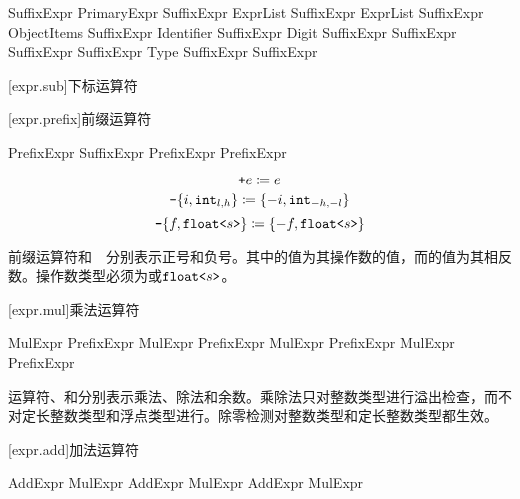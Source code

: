 \begin{bnf}{SuffixExpr}
    PrimaryExpr \br
    SuffixExpr \terminal{[} ExprList\bnfq \terminal{]} \br
    SuffixExpr \terminal{(} ExprList\bnfq \terminal{)} \br
    SuffixExpr \terminal{\{} ObjectItems\bnfq \terminal{\}} \br
    SuffixExpr  Identifier \br
    SuffixExpr  Digit\bnfp \br
    SuffixExpr   \br
    SuffixExpr   \br
    SuffixExpr   \br
    SuffixExpr  Type \br
    SuffixExpr  \br
    SuffixExpr 
\end{bnf}

[expr.sub]{下标运算符}

\pnum


[expr.prefix]{前缀运算符}

\begin{bnf}{PrefixExpr}
    SuffixExpr \br
    \terminal{+} PrefixExpr \br
    \terminal{-} PrefixExpr
\end{bnf}

$$ \texttt{+} e \coloneqq e $$
$$ \texttt{-} \lbrace i, \texttt{int}_{l,h} \rbrace \coloneqq \lbrace -i, \texttt{int}_{-h,-l} \rbrace $$
$$ \texttt{-} \lbrace f, \texttt{float<}s\texttt{>} \rbrace \coloneqq \lbrace -f, \texttt{float<}s\texttt{>}\rbrace $$

\pnum
前缀运算符\tcode{+}和\ \tcode{-}\ 分别表示正号和负号。其中\tcode{+}的值为其操作数的值，而\tcode{-}的值为其相反数。操作数类型必须为或$\texttt{float<}s\texttt{>}$。

[expr.mul]{乘法运算符}

\begin{bnf}{MulExpr}
    PrefixExpr \br
    MulExpr \terminal{*} PrefixExpr \br
    MulExpr \terminal{/} PrefixExpr \br
    MulExpr \terminal{\%} PrefixExpr
\end{bnf}

\pnum
运算符\tcode{*}、\tcode{/}和\tcode{\%}分别表示乘法、除法和余数。乘除法只对整数类型进行溢出检查，而不对定长整数类型和浮点类型进行。除零检测对整数类型和定长整数类型都生效。

[expr.add]{加法运算符}

\begin{bnf}{AddExpr}
    MulExpr \br
    AddExpr \terminal{+} MulExpr \br
    AddExpr \terminal{-} MulExpr
\end{bnf}

